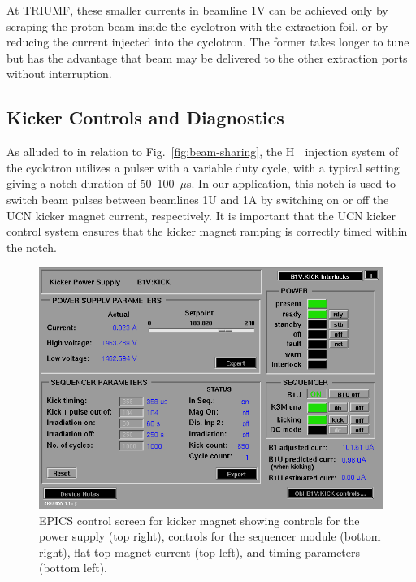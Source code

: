 \documentclass[aps,prab,twocolumn,superscriptaddress]{revtex4-1}
\begin{document}
At TRIUMF, these smaller currents in beamline 1V can be achieved only by scraping the proton beam inside the cyclotron with the extraction foil, or by reducing the current injected into the cyclotron.
The former takes longer to tune but has the advantage that beam may be delivered to the other extraction ports without interruption.



\subsection{Kicker Controls and Diagnostics}
\label{sec:KSM}

As alluded to in relation to Fig.~\ref{fig:beam-sharing}, the H$^{-}$ injection system of the cyclotron utilizes a
pulser with a variable duty cycle, with a typical setting giving a notch duration of 50--100~$\mu$s. In our application, this notch is used to switch beam pulses between beamlines 1U and 1A by switching on or off the UCN kicker magnet current, respectively.  It is important that the UCN kicker control system ensures that the kicker magnet ramping is correctly timed within the notch. 

\begin{figure}[b]%
\includegraphics[width=\linewidth]{kicker_epics_display.png}
\caption{EPICS control screen for kicker magnet showing controls for the power supply (top right), controls for the sequencer module (bottom right), flat-top magnet current (top left), and timing parameters (bottom left).}
\label{fig:ksm_epics_control}
\end{figure}

\end{document}
